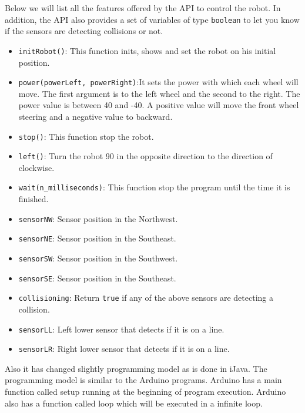 Below we will list all the features offered by the API to control the robot. In addition, the API also provides a set of variables of type \texttt{boolean} to let you know if the sensors are detecting collisions or not.

\begin{itemize}
	\item \texttt{initRobot()}: This function inits, shows and set the robot on his initial position.
	\item \texttt{power(powerLeft, powerRight)}:It sets the power with which each wheel will move. The first argument is to the left wheel and the second to the right. The power value is between 40 and -40. A positive value will move the front wheel steering and a negative value to backward.
	\item \texttt{stop()}: This function stop the robot.
	\item \texttt{left()}: Turn the robot 90 in the opposite direction to the direction of clockwise.
	\item \texttt{wait(n\_milliseconds)}: This function stop the program until the time it is finished.
	\item \texttt{sensorNW}: Sensor position in the Northwest.
		\item \texttt{sensorNE}: Sensor position in the Southeast.
			\item \texttt{sensorSW}: Sensor position in the Southwest.
				\item \texttt{sensorSE}: Sensor position in the Southeast.
		\item \texttt{collisioning}: Return \texttt{true} if any of the above sensors are detecting a collision.
			\item \texttt{sensorLL}: Left lower sensor that detects if it is on a line.
						\item \texttt{sensorLR}: Right lower sensor that detects if it is on a line.
\end{itemize}


Also it has changed slightly programming model as is done in iJava. The programming model is similar to the Arduino programs. Arduino has a main function called setup running at the beginning of program execution. Arduino also has a function called loop which will be executed in a infinite loop.

